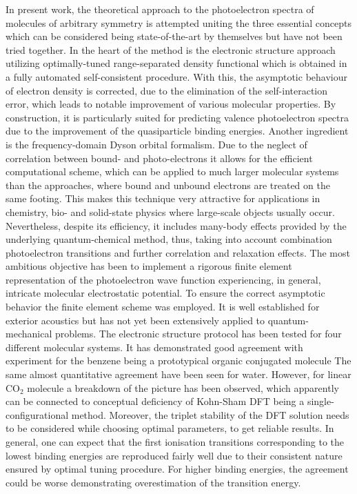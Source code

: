 In present work, the theoretical approach to the photoelectron spectra of molecules of arbitrary symmetry is attempted uniting the three essential concepts which can be considered being state-of-the-art by themselves but have not been tried together. In the heart of the method is the electronic structure approach utilizing optimally-tuned range-separated density functional which is obtained in a fully automated self-consistent procedure. With this, the asymptotic behaviour of electron density is corrected, due to the elimination of the self-interaction error, which leads to notable improvement of various molecular properties. By construction, it is particularly suited for predicting valence photoelectron spectra due to the improvement of the quasiparticle binding energies.
Another ingredient is the frequency-domain Dyson orbital formalism. Due to the neglect of correlation between bound- and photo-electrons it allows for the efficient computational scheme, which can be applied to much larger molecular systems than the approaches, where bound and unbound electrons are treated on the same footing. This makes this technique very attractive for applications in chemistry, bio- and solid-state physics where large-scale objects usually occur. Nevertheless, despite its efficiency, it includes many-body effects provided by the underlying quantum-chemical method, thus, taking into account combination photoelectron transitions and further correlation and relaxation effects.
The most ambitious objective has been to implement a rigorous finite element representation of the photoelectron wave function experiencing, in general, intricate molecular electrostatic potential. To ensure the correct asymptotic behavior the finite element scheme was employed. It is well established for exterior acoustics but has not yet been extensively applied to quantum-mechanical problems.
The electronic structure protocol has been tested for four different molecular systems. It has demonstrated good agreement with experiment for the benzene being a prototypical organic conjugated molecule The same almost quantitative agreement have been seen for water. However, for linear CO$_2$ molecule a breakdown of the picture has been observed, which apparently can be connected to conceptual deficiency of Kohn-Sham DFT being a single-configurational method. Moreover, the triplet stability of the DFT solution needs to be considered while choosing optimal parameters, to get reliable results. In general, one can expect that the first ionisation transitions corresponding to the lowest binding energies are reproduced fairly well due to their consistent nature ensured by optimal tuning procedure. For higher binding energies, the agreement could be worse demonstrating overestimation of the transition energy.
